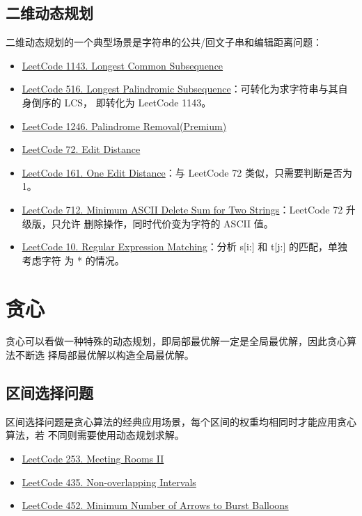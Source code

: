 \subsection{二维动态规划}
二维动态规划的一个典型场景是字符串的公共/回文子串和编辑距离问题：
\begin{itemize}
  \item
    \href{https://leetcode.com/problems/longest-common-subsequence/}{LeetCode 1143. Longest Common Subsequence}
  \item
    \href{https://leetcode.com/problems/longest-palindromic-subsequence/}{LeetCode
      516. Longest Palindromic Subsequence}：可转化为求字符串与其自身倒序的 LCS，
    即转化为 LeetCode 1143。
  \item
    \href{https://leetcode.com/problems/palindrome-removal/}{LeetCode 1246. Palindrome Removal(Premium)}
  \item
    \href{https://leetcode.com/problems/edit-distance/}{LeetCode 72. Edit Distance}
  \item
    \href{https://leetcode.com/problems/one-edit-distance}{LeetCode 161. One
      Edit Distance}：与 LeetCode 72 类似，只需要判断是否为 1。
  \item
    \href{https://leetcode.com/problems/minimum-ascii-delete-sum-for-two-strings/}{LeetCode
      712. Minimum ASCII Delete Sum for Two Strings}：LeetCode 72 升级版，只允许
    删除操作，同时代价变为字符的 ASCII 值。
  \item
    \href{https://leetcode.com/problems/regular-expression-matching/}{LeetCode
      10. Regular Expression Matching}：分析 s[i:] 和 t[j:] 的匹配，单独考虑字符
    为 * 的情况。
\end{itemize}

\section{贪心}
贪心可以看做一种特殊的动态规划，即局部最优解一定是全局最优解，因此贪心算法不断选
择局部最优解以构造全局最优解。

\subsection{区间选择问题}
区间选择问题是贪心算法的经典应用场景，每个区间的权重均相同时才能应用贪心算法，若
不同则需要使用动态规划求解。

\begin{itemize}
  \item
    \href{https://leetcode.com/problems/meeting-rooms-ii}{LeetCode 253. Meeting
      Rooms II}
  \item
    \href{https://leetcode.com/problems/non-overlapping-intervals/}{LeetCode
      435. Non-overlapping Intervals}
  \item
    \href{https://leetcode.com/problems/minimum-number-of-arrows-to-burst-balloons/}{LeetCode
      452. Minimum Number of Arrows to Burst Balloons}
\end{itemize}

